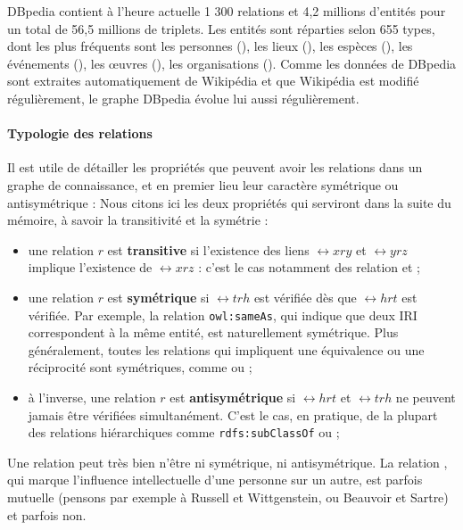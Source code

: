 DBpedia contient à l'heure actuelle 1 300 relations et 4,2 millions d'entités pour un total de 56,5 millions de triplets. Les entités sont réparties selon 655 types, dont les plus fréquents sont les personnes (), les lieux (), les espèces (), les événements (), les œuvres (), les organisations (). Comme les données de DBpedia sont extraites automatiquement de Wikipédia et que Wikipédia est modifié régulièrement, le graphe DBpedia évolue lui aussi régulièrement.


\paragraph{Typologie des relations} 

Il est utile de détailler les propriétés que peuvent avoir les relations dans un graphe de connaissance, et en premier lieu leur caractère symétrique ou antisymétrique :
Nous citons ici les deux propriétés qui serviront dans la suite du mémoire, à savoir la transitivité et la symétrie :
\begin{itemize}
    \item une relation $r$ est \textbf{transitive} si l'existence des liens $\rel{x}{r}{y}$ et $\rel{y}{r}{z}$ implique l'existence de $\rel{x}{r}{z}$ : c'est le cas notamment des relation  et ;
    \item une relation $r$ est \textbf{symétrique} si $\rel{t}{r}{h}$ est vérifiée dès que $\rel{h}{r}{t}$ est vérifiée. Par exemple, la relation \texttt{owl:sameAs}, qui indique que deux IRI correspondent à la même entité, est naturellement symétrique. Plus généralement, toutes les relations qui impliquent une équivalence ou une réciprocité sont symétriques, comme  ou ;
    \item à l'inverse, une relation $r$ est \textbf{antisymétrique} si $\rel{h}{r}{t}$ et $\rel{t}{r}{h}$ ne peuvent jamais être vérifiées simultanément. C'est le cas, en pratique, de la plupart des relations hiérarchiques comme \texttt{rdfs:subClassOf} ou ;
\end{itemize}
Une relation peut très bien n'être ni symétrique, ni antisymétrique. La relation , qui marque l'influence intellectuelle d'une personne sur un autre, est parfois mutuelle (pensons par exemple à Russell et Wittgenstein, ou Beauvoir et Sartre) et parfois non.



